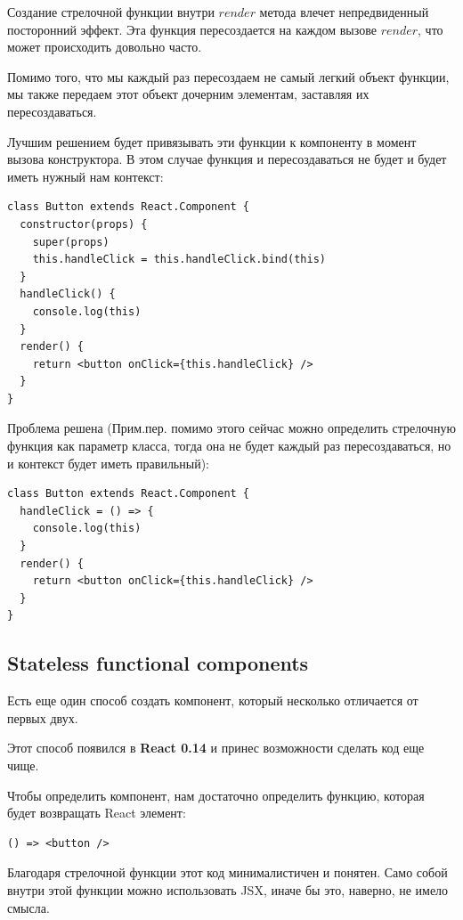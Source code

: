 Создание стрелочной функции внутри $render$ метода влечет непредвиденный посторонний эффект. Эта функция пересоздается на каждом вызове $render$, что может происходить довольно часто. 

Помимо того, что мы каждый раз пересоздаем не самый легкий объект функции, мы также передаем этот объект дочерним элементам, заставляя их пересоздаваться.

Лучшим решением будет привязывать эти функции к компоненту в момент вызова конструктора. В этом случае функция и пересоздаваться не будет и будет иметь нужный нам контекст:

\begin{lstlisting}
class Button extends React.Component {
  constructor(props) {
    super(props)
    this.handleClick = this.handleClick.bind(this)
  }
  handleClick() {
    console.log(this)
  }
  render() {
    return <button onClick={this.handleClick} />
  } 
}
\end{lstlisting}

Проблема решена (Прим.пер. помимо этого сейчас можно определить стрелочную функция как параметр класса, тогда она не будет каждый раз пересоздаваться, но и контекст будет иметь правильный):

\begin{lstlisting}
class Button extends React.Component {
  handleClick = () => {
    console.log(this)
  }
  render() {
    return <button onClick={this.handleClick} />
  } 
}
\end{lstlisting}

\subsection{Stateless functional components}

Есть еще один способ создать компонент, который несколько отличается от первых двух.

Этот способ появился в \textbf{React 0.14} и принес возможности сделать код еще чище.

Чтобы определить компонент, нам достаточно определить функцию, которая будет возвращать React элемент:

\begin{lstlisting}
() => <button />
\end{lstlisting}

Благодаря стрелочной функции этот код минималистичен и понятен. Само собой внутри этой функции можно использовать JSX, иначе бы это, наверно, не имело смысла.

